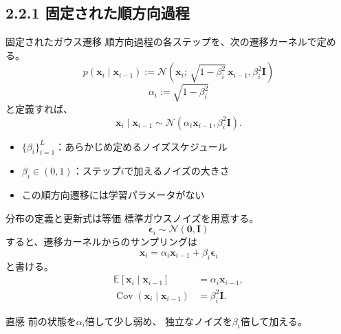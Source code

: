 \subsection{2.2.1 固定された順方向過程}
\begin{frame}{固定されたガウス遷移}
    順方向過程の各ステップを、次の遷移カーネルで定める。
    \[
        \boxed{
        p(\boldsymbol{x}_i\mid\boldsymbol{x}_{i-1})
        :=
        \mathcal{N}\!\left(
        \boldsymbol{x}_i;\,
        \sqrt{1-\beta_i^2}\,\boldsymbol{x}_{i-1},
        \beta_i^2\boldsymbol{I}
        \right)
        }
    \]
    \[
        \alpha_i:=\sqrt{1-\beta_i^2}
    \]
    と定義すれば、
    \[
        \boldsymbol{x}_i\mid\boldsymbol{x}_{i-1}
        \sim
        \mathcal{N}\!\left(
        \alpha_i\boldsymbol{x}_{i-1},
        \beta_i^2\boldsymbol{I}
        \right).
    \]
    \begin{itemize}
        \item $\{\beta_i\}_{i=1}^{L}$：あらかじめ定めるノイズスケジュール
        \item $\beta_i\in(0,1)$：ステップ$i$で加えるノイズの大きさ
        \item この順方向遷移には学習パラメータがない
    \end{itemize}
\end{frame}
\begin{frame}{分布の定義と更新式は等価}
    標準ガウスノイズを用意する。
    \[
        \boldsymbol{\epsilon}_i\sim\mathcal{N}(\boldsymbol{0},\boldsymbol{I})
    \]
    すると、遷移カーネルからのサンプリングは
    \[
        \boxed{
        \boldsymbol{x}_i
        =
        \alpha_i\boldsymbol{x}_{i-1}
        +
        \beta_i\boldsymbol{\epsilon}_i
        }
    \]
    と書ける。
    \begin{align*}
        \mathbb{E}[\boldsymbol{x}_i\mid\boldsymbol{x}_{i-1}]
        &=\alpha_i\boldsymbol{x}_{i-1},\\
        \operatorname{Cov}(\boldsymbol{x}_i\mid\boldsymbol{x}_{i-1})
        &=\beta_i^2\boldsymbol{I}.
    \end{align*}
    \begin{exampleblock}{直感}
        前の状態を$\alpha_i$倍して少し弱め、
        独立なノイズを$\beta_i$倍して加える。
    \end{exampleblock}
\end{frame}
